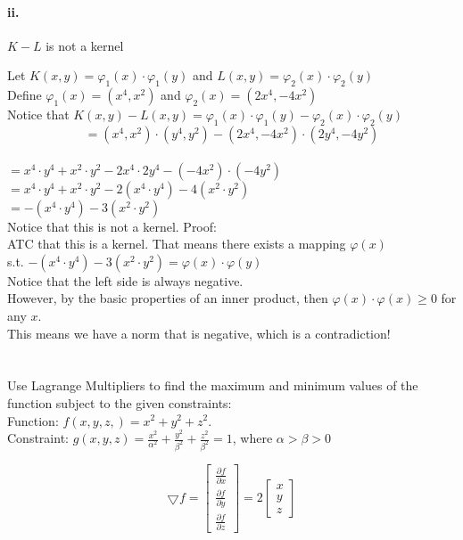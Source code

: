 \documentclass[12pt]{article}
\newcommand\tab[1][1cm]{\hspace*{#1}}
\begin{document}
\paragraph{\tab ii.}

$K - L$ is not a kernel

Let $K(x,y) = \varphi_1(x)\cdot\varphi_1(y)$ and $L(x,y) = \varphi_2(x)\cdot\varphi_2(y)$ \\
Define $\varphi_1(x) = (x^4, x^2)$ and $\varphi_2(x) = (2x^4, -4x^2) $ \\
Notice that $ K(x,y) - L(x,y) = \varphi_1(x)\cdot\varphi_1(y) - \varphi_2(x)\cdot\varphi_2(y) $ \\
$$ = (x^4, x^2)\cdot(y^4,y^2) - (2x^4, -4x^2)\cdot(2y^4, -4y^2) $$ \\
$ = x^4 \cdot y^4 + x^2 \cdot y^2 - 2x^4 \cdot 2y^4 - (-4x^2) \cdot (-4y^2) $ \\
$ = x^4 \cdot y^4 + x^2 \cdot y^2 - 2(x^4 \cdot y^4) - 4(x^2 \cdot y^2) $ \\
$ = -(x^4 \cdot y^4) - 3(x^2 \cdot y^2) $ \\
Notice that this is not a kernel. Proof: \\
ATC that this is a kernel. That means there exists a mapping $\varphi(x)$ \\
s.t. $ -(x^4 \cdot y^4) - 3(x^2 \cdot y^2) = \varphi(x) \cdot \varphi(y) $ \\
Notice that the left side is always negative. \\
However, by the basic properties of an inner product, then $ \varphi(x)\cdot\varphi(x) \geq 0 $ for any $x$. \\
This means we have a norm that is negative, which is a contradiction!
			
\newpage

\section*{}


\tab Use Lagrange Multipliers to find the maximum and minimum values of the function subject to the given constraints: \\
\tab Function: $f(x,y,z,) = x^2 + y^2 + z^2$.  \\
\tab Constraint: $g(x,y,z) = \frac{x^2}{\alpha^2} + \frac{y^2}{\beta^2} + \frac{z^2}{\beta^2} = 1$, where $ \alpha > \beta > 0$ 


$$
\bigtriangledown f = 
\begin{bmatrix}
\frac{\partial f}{\partial x} \\
\frac{\partial f}{\partial y} \\
\frac{\partial f}{\partial z} 
\end{bmatrix} = 2
\begin{bmatrix}
x \\
y \\
z
\end{bmatrix}
 $$
 
\end{document}

